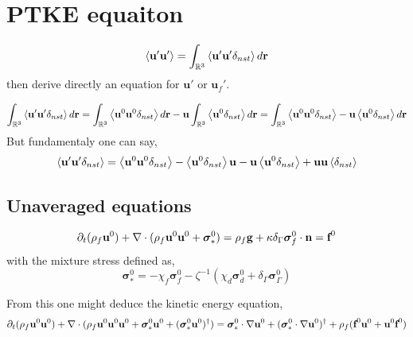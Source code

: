 \section{PTKE equaiton}


\begin{equation}
    \left<\textbf{u}'\textbf{u}'\right>
    =
    \int_{\mathbb{R}^3}\left<\textbf{u}'\textbf{u}'\delta_{nst}\right> d\textbf{r}
\end{equation}
then derive directly an equation for $\textbf{u}'$ or $\textbf{u}_f'$. 

\begin{equation}
    \int_{\mathbb{R}^3}\left<\textbf{u}'\textbf{u}'\delta_{nst}\right> d\textbf{r}
    =
    \int_{\mathbb{R}^3}\left<\textbf{u}^0\textbf{u}^0\delta_{nst}\right> d\textbf{r}
    - \textbf{u}\int_{\mathbb{R}^3}\left<\textbf{u}^0\delta_{nst}\right> d\textbf{r}
    =
    \int_{\mathbb{R}^3}\left<\textbf{u}^0\textbf{u}^0\delta_{nst}\right> - \textbf{u} \left<\textbf{u}^0 \delta_{nst}\right>d\textbf{r}
\end{equation}
But fundamentaly one can say,
\begin{equation}
    \left<\textbf{u}'\textbf{u}'\delta_{nst}\right>
    =
    \left<\textbf{u}^0\textbf{u}^0\delta_{nst}\right>
    -\left<\textbf{u}^0\delta_{nst}\right>\textbf{u}
    -\textbf{u}\left<\textbf{u}^0\delta_{nst}\right>
    +\textbf{u}\textbf{u}\left<\delta_{nst}\right>
\end{equation}



\subsection{Unaveraged equations }
\begin{equation}
    \partial_t(\rho_f\textbf{u}^0) + \mathbf{\nabla}\cdot (\rho_f \textbf{u}^0\textbf{u}^0 + \bm\sigma^0_*)
    = 
    \rho_f \textbf{g}
    +\kappa  \delta_{\Gamma}  \bm\sigma_f^0 \cdot \textbf{n}
    = \textbf{f}^0
\end{equation}
with the mixture stress defined as, 
\begin{equation}
    \bm\sigma^0_*
    =
    - \chi_f \bm\sigma_f^0  
    - \zeta^{-1} (\chi_d \bm\sigma_d^0 + \delta_{\Gamma} \bm\sigma_{\Gamma}^0)  
\end{equation}

From this one might deduce the kinetic energy equation, 
\begin{multline}
    \partial_t(\rho_f\textbf{u}^0\textbf{u}^0) + \mathbf{\nabla}\cdot (\rho_f \textbf{u}^0\textbf{u}^0\textbf{u}^0 + \bm\sigma^0_*\textbf{u}^0 + (\bm\sigma_*^0 \textbf{u}^0 )^\dagger )
    = 
    \bm\sigma_*^0 \cdot \mathbf{\nabla} \textbf{u}^0
    +(\bm\sigma_*^0 \cdot \mathbf{\nabla} \textbf{u}^0)^\dagger
    + \rho_f (\textbf{f}^0 \textbf{u}^0 + \textbf{u}^0 \textbf{f}^0)
\end{multline}



